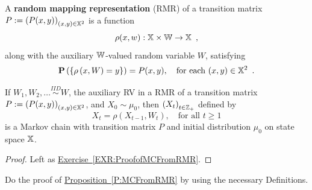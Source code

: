 \begin{definition}\label{D:RMR}
A {\bf random mapping representation} (RMR) of a transition matrix $P := \left(P(x,y)\right)_{(x,y)\in\mathbb{X}^2}$ is a function 
\begin{equation}\label{E:RMRrho}
\rho(x,w): \mathbb{X} \times \mathbb{W} \to \mathbb{X} \enspace ,
\end{equation}
along with the auxiliary $\mathbb{W}$-valued random variable $W$, satisfying
\begin{equation}\label{E:RMRProbrho}
\mathbf{P} \left( \{ \rho \left( x,W \right) = y  \} \right) = P(x,y), \quad \text{for each } (x,y) \in \mathbb{X}^2 \enspace .
\end{equation}
\end{definition}

\begin{prop}\label{P:MCFromRMR}
If $W_1,W_2,\ldots \overset{IID}{\sim} W$, the auxiliary RV in  a RMR of a transition matrix $P := \left(P(x,y)\right)_{(x,y)\in\mathbb{X}^2}$, and  $X_0 \sim \mu_0$, then $\left(X_t\right)_{t\in\mathbb{Z}_+}$ defined by
\[
X_t = \rho \left(X_{t-1},W_t\right), \quad \text{for all } t \geq 1
\]
is a Markov chain with transition matrix $P$ and initial distribution $\mu_0$ on state space $\mathbb{X}$.
\begin{proof}
Left as \hyperref[EXR:ProofofMCFromRMR]{Exercise~\ref*{EXR:ProofofMCFromRMR}}.
\end{proof}
\end{prop}

\begin{exercise}\label{EXR:ProofofMCFromRMR}
Do the proof of \hyperref[P:MCFromRMR]{Proposition~\ref*{P:MCFromRMR}} by using the necessary Definitions.
\end{exercise}


